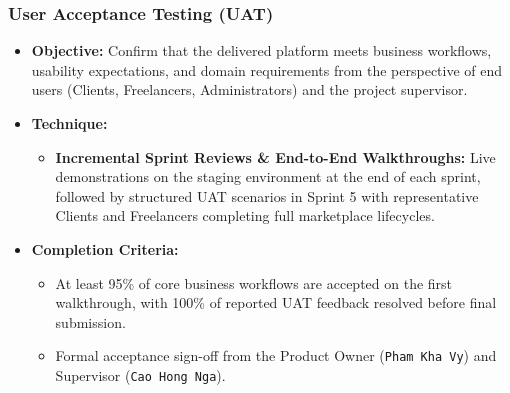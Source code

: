 \documentclass[12pt,a4paper]{article}
\begin{document}
\subsubsection{User Acceptance Testing (UAT)}
\begin{itemize}
  \item \textbf{Objective:} Confirm that the delivered platform meets business workflows, usability expectations, and domain requirements from the perspective of end users (Clients, Freelancers, Administrators) and the project supervisor.
  \item \textbf{Technique:}
  \begin{itemize}
    \item \textbf{Incremental Sprint Reviews \& End-to-End Walkthroughs:} Live demonstrations on the staging environment at the end of each sprint, followed by structured UAT scenarios in Sprint 5 with representative Clients and Freelancers completing full marketplace lifecycles.
  \end{itemize}
  \item \textbf{Completion Criteria:}
  \begin{itemize}
    \item At least 95\% of core business workflows are accepted on the first walkthrough, with 100\% of reported UAT feedback resolved before final submission.
    \item Formal acceptance sign-off from the Product Owner (\texttt{Pham Kha Vy}) and Supervisor (\texttt{Cao Hong Nga}).
  \end{itemize}
\end{itemize}
\end{document}

